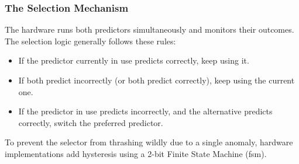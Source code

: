 \subsubsection*{The Selection Mechanism}
The hardware runs both predictors simultaneously and monitors their outcomes. The selection logic generally follows these rules:
\begin{itemize}
    \item If the predictor currently in use predicts correctly, keep using it.
    \item If both predict incorrectly (or both predict correctly), keep using the current one.
    \item If the predictor in use predicts incorrectly, and the alternative predicts correctly, switch the preferred predictor.
\end{itemize}

To prevent the selector from thrashing wildly due to a single anomaly, hardware implementations add hysteresis using a 2-bit Finite State Machine (\gls{fsm}). 


